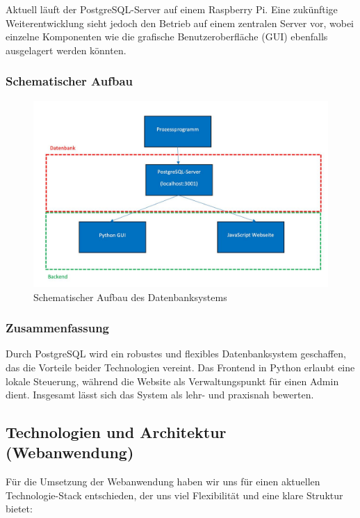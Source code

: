 Aktuell läuft der PostgreSQL-Server auf einem Raspberry Pi. Eine zukünftige Weiterentwicklung sieht jedoch den Betrieb auf einem zentralen Server vor, wobei einzelne Komponenten wie die grafische Benutzeroberfläche (GUI) ebenfalls ausgelagert werden könnten.


\subsubsection{Schematischer Aufbau}\label{subsubsec:schematischer_aufbau}

\begin{figure}[h]
	\centering
	\includegraphics[width=0.4\linewidth]{figures/Schematischer Aufbau.jpeg}
	\caption[Schematischer Aufbau]{Schematischer Aufbau des Datenbanksystems}\label{fig:schematischer_aufbau}
\end{figure}


\subsubsection{Zusammenfassung}\label{subsubsec:zusammenfassung}

Durch PostgreSQL wird ein robustes und flexibles Datenbanksystem geschaffen, das die Vorteile beider Technologien vereint. Das Frontend in Python erlaubt eine lokale Steuerung, während die Website als Verwaltungspunkt für einen Admin dient. Insgesamt lässt sich das System als lehr- und praxisnah bewerten.


\subsection{Technologien und Architektur (Webanwendung)}

Für die Umsetzung der Webanwendung haben wir uns für einen aktuellen Technologie-Stack entschieden, der uns viel Flexibilität und eine klare Struktur bietet:

